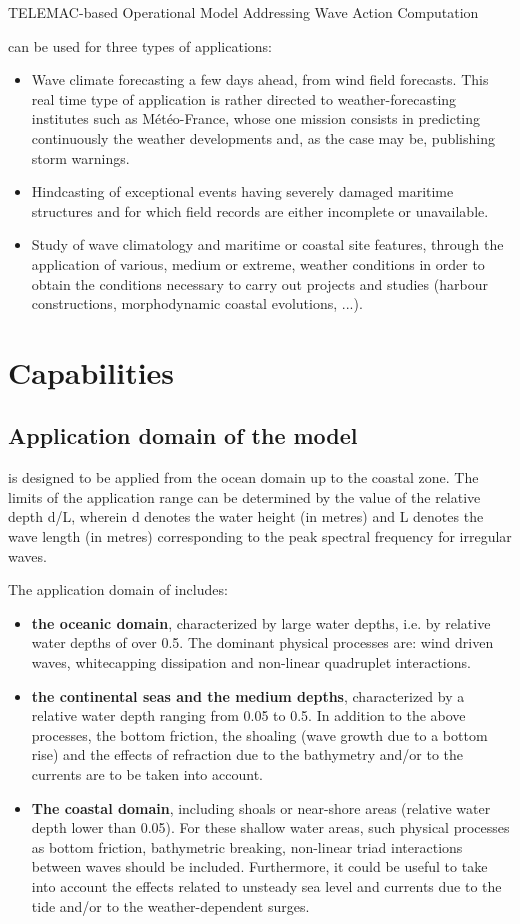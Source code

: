 TELEMAC-based Operational Model Addressing Wave Action Computation

\tomawac can be used for three types of applications:
\begin{itemize}
\item	Wave climate forecasting a few days ahead, from wind field forecasts. This real time type of application is rather directed to weather-forecasting institutes such as Météo-France, whose one mission consists in predicting continuously the weather developments and, as the case may be, publishing storm warnings.
\item	Hindcasting of exceptional events having severely damaged maritime structures and for which field records are either incomplete or unavailable.
\item	Study of wave climatology and maritime or coastal site features, through the application of various, medium or extreme, weather conditions in order to obtain the conditions necessary to carry out projects and studies (harbour constructions, morphodynamic coastal evolutions, ...).
\end{itemize}

\section{Capabilities}
 \subsection{Application domain of the model \tomawac}
\label{par31}
\tomawac is designed to be applied from the ocean domain up to the coastal zone. The limits of the application range can be determined by the value of the relative depth d/L, wherein d denotes the water height (in metres) and L denotes the wave length (in metres) corresponding to the peak spectral frequency for irregular waves.

The application domain of \tomawac includes:
\begin{itemize}
\item {\bf the oceanic domain}, characterized by large water depths, i.e. by relative water depths of over 0.5. The dominant physical processes are: wind driven waves, whitecapping dissipation and non-linear quadruplet interactions.
\item {\bf the continental seas and the medium depths}, characterized by a relative water depth ranging from 0.05 to 0.5. In addition to the above processes, the bottom friction, the shoaling (wave growth due to a bottom rise) and the effects of refraction due to the bathymetry and/or to the currents are to be taken into account.
\item {\bf The coastal domain}, including shoals or near-shore areas (relative water depth lower than 0.05). For these shallow water areas, such physical processes as bottom friction, bathymetric breaking, non-linear triad interactions between waves should be included. Furthermore, it could be useful to take into account the effects related to unsteady sea level and currents due to the tide and/or to the weather-dependent surges.
\end{itemize}


